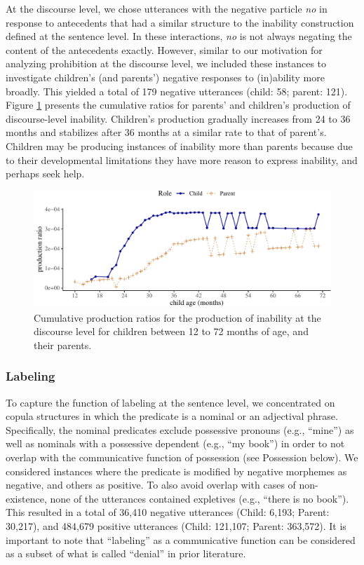 \documentclass[
  man,floatsintext]{apa6}
\begin{document}
At the discourse level, we chose utterances with the negative particle \emph{no} in response to antecedents that had a similar structure to the inability construction defined at the sentence level. In these interactions, \emph{no} is not always negating the content of the antecedents exactly. However, similar to our motivation for analyzing prohibition at the discourse level, we included these instances to investigate children's (and parents') negative responses to (in)ability more broadly. This yielded a total of 179 negative utterances (child: 58; parent: 121). Figure \ref{fig:inabilitydiscourse} presents the cumulative ratios for parents' and children's production of discourse-level inability. Children's production gradually increases from 24 to 36 months and stabilizes after 36 months at a similar rate to that of parent's. Children may be producing instances of inability more than parents because due to their developmental limitations they have more reason to express inability, and perhaps seek help.

\begin{figure}[H]

{\centering \includegraphics{neg_construction_article_files/figure-latex/inabilitydiscourse-1} 

}

\caption{Cumulative production ratios for the production of inability at the discourse level for children between 12 to 72 months of age, and their parents.}\label{fig:inabilitydiscourse}
\end{figure}

\subsubsection{Labeling}\label{labeling}

To capture the function of labeling at the sentence level, we concentrated on copula structures in which the predicate is a nominal or an adjectival phrase. Specifically, the nominal predicates exclude possessive pronouns (e.g., ``mine'') as well as nominals with a possessive dependent (e.g., ``my book'') in order to not overlap with the communicative function of possession (see Possession below). We considered instances where the predicate is modified by negative morphemes as negative, and others as positive. To also avoid overlap with cases of non-existence, none of the utterances contained expletives (e.g., ``there is no book''). This resulted in a total of 36,410 negative utterances (Child: 6,193; Parent: 30,217), and 484,679 positive utterances (Child: 121,107; Parent: 363,572). It is important to note that ``labeling'' as a communicative function can be considered as a subset of what is called ``denial'' in prior literature.
\end{document}
